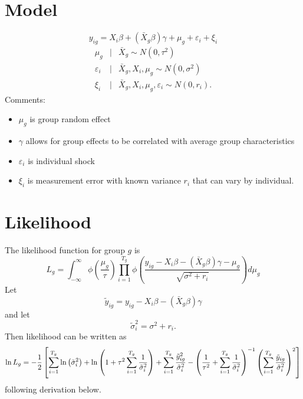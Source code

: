 \documentclass[12pt]{article}
\begin{document}
\section{Model}

\[
y_{ig}=X_{i}\beta +\left( \bar{X}_{g}\beta \right) \gamma +\mu
_{g}+\varepsilon _{i}+\xi _{i}
\]%
\qquad 
\begin{eqnarray*}
\mu _{g} &\mid &\bar{X}_{g}\sim N\left( 0,\tau ^{2}\right)  \\
\varepsilon _{i} &\mid &\bar{X}_{g},X_{i},\mu _{g}\sim N\left( 0,\sigma
^{2}\right)  \\
\xi _{i} &\mid &\bar{X}_{g},X_{i},\mu _{g},\varepsilon _{i}\sim N\left(
0,r_{i}\right) .
\end{eqnarray*}%
Comments:

\begin{itemize}
\item $\mu _{g}$ is group random effect

\item $\gamma $ allows for group effects to be correlated with average group
characteristics

\item $\varepsilon _{i}$ is individual shock

\item $\xi _{i}$ is measurement error with known variance $r_{i}$ that can
vary by individual.
\end{itemize}

\section{Likelihood}

The likelihood function for group $g$ is%
\[
L_{g}=\int_{-\infty }^{\infty }\phi \left( \frac{\mu _{g}}{\tau }\right)
\prod_{i=1}^{T_{g}}\phi \left( \frac{y_{ig}-X_{i}\beta -\left( \bar{X}%
_{g}\beta \right) \gamma -\mu _{g}}{\sqrt{\sigma ^{2}+r_{i}}}\right) d\mu
_{g}
\]%
Let%
\[
\tilde{y}_{ig}=y_{ig}-X_{i}\beta -\left( \bar{X}_{g}\beta \right) \gamma 
\]%
and let%
\[
\tilde{\sigma}_{i}^{2}=\sigma ^{2}+r_{i}.
\]%
Then likelihood can be written as%
\[
\ln L_{g}=-\frac{1}{2}\left[ \sum_{i=1}^{T_{g}}\ln \left( \tilde{\sigma}%
_{i}^{2}\right) +\ln \left( 1+\tau ^{2}\sum_{i=1}^{T_{g}}\frac{1}{\tilde{%
\sigma}_{i}^{2}}\right) +\sum_{i=1}^{T_{g}}\frac{\tilde{y}_{ig}^{2}}{\tilde{%
\sigma}_{i}^{2}}-\left( \frac{1}{\tau ^{2}}+\sum_{i=1}^{T_{g}}\frac{1}{%
\tilde{\sigma}_{i}^{2}}\right) ^{-1}\left( \sum_{i=1}^{T_{g}}\frac{\tilde{y}%
_{ig}}{\tilde{\sigma}_{i}^{2}}\right) ^{2}\right] 
\]%
following derivation below.
\end{document}
